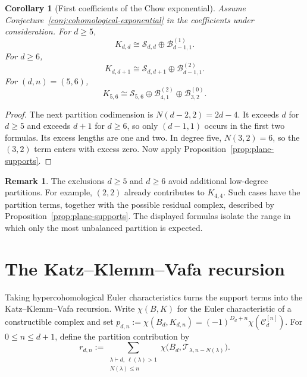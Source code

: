 \documentclass[11pt,reqno]{amsart}
\newtheorem{corollary}[theorem]{Corollary}
\theoremstyle{definition}
\newtheorem{remark}[theorem]{Remark}
\begin{document}
\begin{corollary}[First coefficients of the Chow exponential]
\label{cor:plane-exponential-window}
Assume Conjecture~\ref{conj:cohomological-exponential} in the coefficients
under consideration.  For $d\ge5$,
\begin{equation}\label{eq:second-plane-boundary}
 K_{d,d}
 \cong
 \mathcal S_{d,d}\oplus\mathcal B_{d-1,1}^{(1)}.
\end{equation}
For $d\ge6$,
\begin{equation}\label{eq:third-plane-boundary}
 K_{d,d+1}
 \cong
 \mathcal S_{d,d+1}\oplus\mathcal B_{d-1,1}^{(2)}.
\end{equation}
For $(d,n)=(5,6)$,
\begin{equation}\label{eq:quintic-six-boundary}
  K_{5,6}
  \cong
  \mathcal S_{5,6}
  \oplus\mathcal B_{4,1}^{(2)}
  \oplus\mathcal B_{3,2}^{(0)}.
\end{equation}
\end{corollary}

\begin{proof}
The next partition codimension is $N(d-2,2)=2d-4$.  It exceeds $d$ for
$d\ge5$ and exceeds $d+1$ for $d\ge6$, so only $(d-1,1)$ occurs in the
first two formulas.  Its excess lengths are one and two.  In degree five,
$N(3,2)=6$, so the $(3,2)$ term enters with excess zero.  Now apply
Proposition~\ref{prop:plane-supports}.
\end{proof}

\begin{remark}
The exclusions $d\ge5$ and $d\ge6$ avoid additional low-degree
partitions.  For example, $(2,2)$ already contributes to $K_{4,4}$.  Such
cases have the partition terms, together with the possible residual
complex, described by Proposition~\ref{prop:plane-supports}.  The displayed
formulas isolate the range in which only the most unbalanced partition is
expected.
\end{remark}

\section{The Katz--Klemm--Vafa recursion}
\label{sec:kkv-interpretation}

Taking hypercohomological Euler characteristics turns the support terms into
the Katz--Klemm--Vafa recursion.  Write $\chi(B,K)$ for the Euler
characteristic of a constructible complex and set
$p_{d,n}:=\chi(B_d,K_{d,n})=(-1)^{D_d+n}\chi(\mathcal C_d^{[n]})$.
For $0\le n\le d+1$, define the partition contribution by
\begin{equation}\label{eq:kkv-rdn}
  r_{d,n}:={}
  \sum_{\substack{\lambda\vdash d,\ \ell(\lambda)>1\\
                   N(\lambda)\le n}}
  \chi\bigl(B_d,\mathcal T_{\lambda,n-N(\lambda)}\bigr).
\end{equation}
\end{document}
